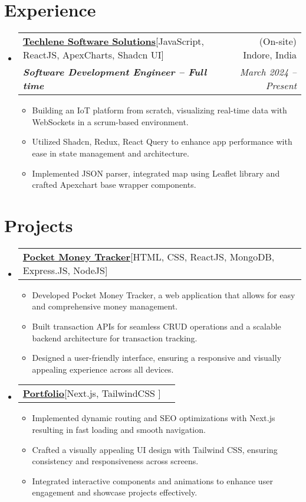 \documentclass[letterpaper,11pt]{article}
\makeatletter
\newcommand{\resumeItem}[1]{
    \item\small{
      {#1 \vspace{-2pt}}
    }
  }
\newcommand{\resumeSubheading}[4]{
    \vspace{-2pt}\item
      \begin{tabular*}{0.97\textwidth}[t]{l@{\extracolsep{\fill}}r}
        {#1} & #2 \\
        \textit{\small#3} & \textit{\small #4}\\
      \end{tabular*}\vspace{-7pt}
  }
\newcommand{\resumeProjectHeading}[2]{
      \item
      \begin{tabular*}{0.97\textwidth}{l@{\extracolsep{\fill}}r}
        \small#1 & #2 \\
      \end{tabular*}\vspace{-7pt}
  }
\newcommand{\resumeSubHeadingListStart}{\begin{itemize}[leftmargin=0.15in, label={}]}
\newcommand{\resumeSubHeadingListEnd}{\end{itemize}}
\newcommand{\resumeItemListStart}{\begin{itemize}}
\newcommand{\resumeItemListEnd}{\end{itemize}\vspace{-5pt}}
\makeatother
\begin{document}

\section{Experience}
\resumeSubHeadingListStart

\resumeSubheading
{\textbf{\href{https://www.techlene.com/}{Techlene Software Solutions}\hspace{5pt}}{{[JavaScript, ReactJS, ApexCharts, Shadcn UI]}}}{(On-site) Indore, India}
{\textbf{Software Development Engineer – Full time}}{March 2024 -- Present}
\resumeItemListStart
\resumeItem{Building an IoT platform from scratch, visualizing real-time data with WebSockets in a scrum-based environment.}
\resumeItem{Utilized Shadcn, Redux, React Query to enhance app performance with ease in state management and architecture.}
\resumeItem{Implemented JSON parser, integrated map using Leaflet library and crafted Apexchart base wrapper components.}
\resumeItemListEnd
\resumeSubHeadingListEnd



\section{Projects}

\resumeSubHeadingListStart
\resumeProjectHeading
{\textbf{\href{https://github.com/shanutiwari1010/money-tracker-app}{Pocket Money Tracker}\hspace{5pt}}{[HTML, CSS, ReactJS, MongoDB, Express.JS, NodeJS]}}{}
\resumeItemListStart
\resumeItem{Developed Pocket Money Tracker, a web application that allows for easy and comprehensive money management.}
\resumeItem{Built transaction APIs for seamless CRUD operations and a scalable backend architecture for transaction tracking.}
\resumeItem{Designed a user-friendly interface, ensuring a responsive and visually appealing experience across all devices.}
\resumeItemListEnd
\resumeSubHeadingListEnd

\resumeSubHeadingListStart
\resumeProjectHeading
{\textbf{\href{https://github.com/shanutiwari1010/portfolio}{Portfolio}\hspace{5pt}}{{[Next.js, TailwindCSS ]}}}{}
\resumeItemListStart
\resumeItem{Implemented dynamic routing and SEO optimizations with Next.js resulting in fast loading and smooth navigation.}
\resumeItem{Crafted a visually appealing UI design with Tailwind CSS, ensuring consistency and responsiveness across screens.}
\resumeItem{Integrated interactive components and animations to enhance user engagement and showcase projects effectively.}
\resumeItemListEnd
\resumeSubHeadingListEnd
\end{document}
